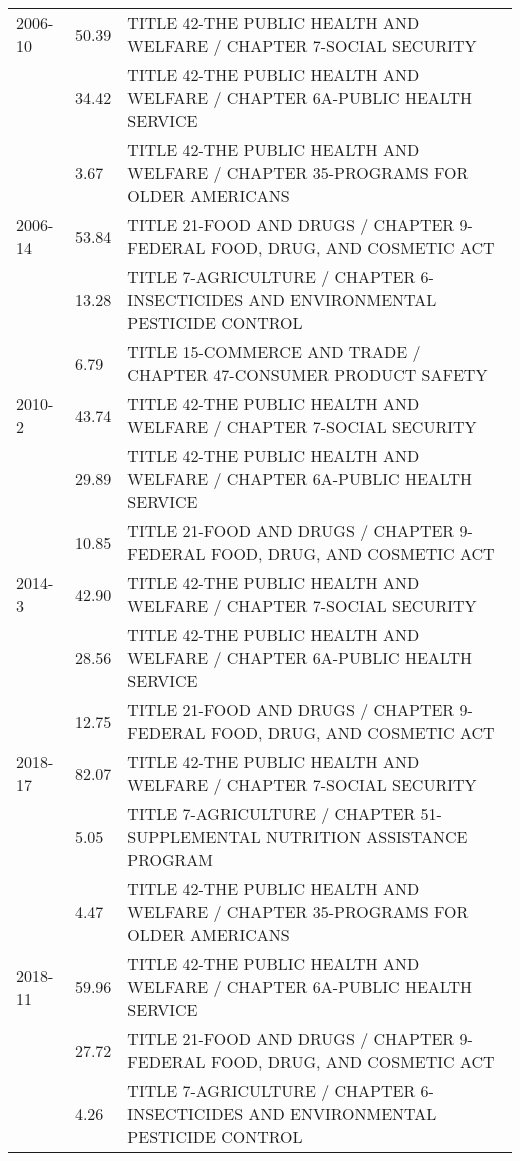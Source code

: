 \begin{tabular}{p{}R{0.08\textwidth}p{0.9\textwidth}}
2006-10&50.39 &	TITLE 42-THE PUBLIC HEALTH AND WELFARE / CHAPTER 7-SOCIAL SECURITY\\
&34.42 &	TITLE 42-THE PUBLIC HEALTH AND WELFARE / CHAPTER 6A-PUBLIC HEALTH SERVICE\\
&3.67 &	TITLE 42-THE PUBLIC HEALTH AND WELFARE / CHAPTER 35-PROGRAMS FOR OLDER AMERICANS\\
2006-14&53.84 &	TITLE 21-FOOD AND DRUGS / CHAPTER 9-FEDERAL FOOD, DRUG, AND COSMETIC ACT\\
&13.28 &	TITLE 7-AGRICULTURE / CHAPTER 6-INSECTICIDES AND ENVIRONMENTAL PESTICIDE CONTROL\\
&6.79 &	TITLE 15-COMMERCE AND TRADE / CHAPTER 47-CONSUMER PRODUCT SAFETY\\[6pt]
2010-2&43.74 &	TITLE 42-THE PUBLIC HEALTH AND WELFARE / CHAPTER 7-SOCIAL SECURITY\\
&29.89 &	TITLE 42-THE PUBLIC HEALTH AND WELFARE / CHAPTER 6A-PUBLIC HEALTH SERVICE\\
&10.85 &	TITLE 21-FOOD AND DRUGS / CHAPTER 9-FEDERAL FOOD, DRUG, AND COSMETIC ACT\\[6pt]
2014-3&42.90 &	TITLE 42-THE PUBLIC HEALTH AND WELFARE / CHAPTER 7-SOCIAL SECURITY\\
&28.56 &	TITLE 42-THE PUBLIC HEALTH AND WELFARE / CHAPTER 6A-PUBLIC HEALTH SERVICE\\
&12.75 &	TITLE 21-FOOD AND DRUGS / CHAPTER 9-FEDERAL FOOD, DRUG, AND COSMETIC ACT\\[6pt]
2018-17&82.07 &	TITLE 42-THE PUBLIC HEALTH AND WELFARE / CHAPTER 7-SOCIAL SECURITY\\
&5.05 &	TITLE 7-AGRICULTURE / CHAPTER 51-SUPPLEMENTAL NUTRITION ASSISTANCE PROGRAM\\
&4.47 &	TITLE 42-THE PUBLIC HEALTH AND WELFARE / CHAPTER 35-PROGRAMS FOR OLDER AMERICANS\\
2018-11&59.96 &	TITLE 42-THE PUBLIC HEALTH AND WELFARE / CHAPTER 6A-PUBLIC HEALTH SERVICE\\
&27.72 &	TITLE 21-FOOD AND DRUGS / CHAPTER 9-FEDERAL FOOD, DRUG, AND COSMETIC ACT\\
&4.26 &	TITLE 7-AGRICULTURE / CHAPTER 6-INSECTICIDES AND ENVIRONMENTAL PESTICIDE CONTROL\\
\end{tabular}
\egroup
